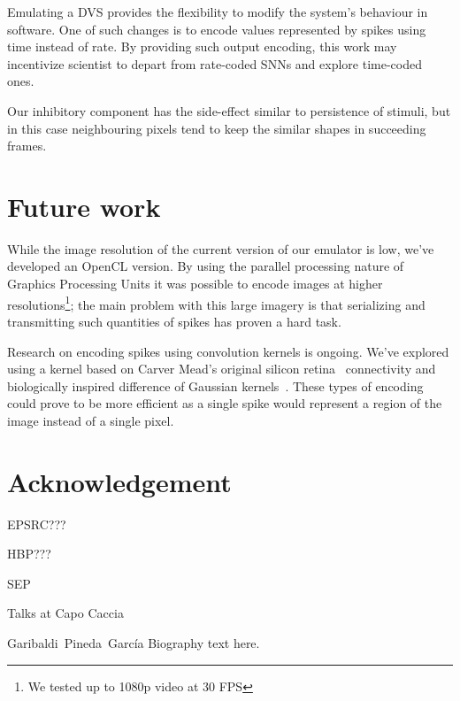 \documentclass[conference]{IEEEtran}
\begin{document}
Emulating a DVS provides the flexibility to modify the system's behaviour in software. One of such changes is to encode values represented by spikes using time instead of rate. By providing such output encoding, this work may incentivize  scientist to depart from rate-coded SNNs and explore time-coded ones.

Our inhibitory component has the side-effect similar to persistence of stimuli, but in this case neighbouring pixels tend to keep the similar shapes in succeeding frames. 

\section{Future work}
\label{sec:future-work}
While the image resolution of the current version of our emulator is low, we've developed an OpenCL version. By using the parallel processing nature of Graphics Processing Units it was possible to encode images at higher resolutions\footnote{We tested up to 1080p video at 30 FPS}; the main problem with this large imagery is that serializing and transmitting such quantities of spikes has proven a hard task.

Research on encoding spikes using convolution kernels is ongoing. We've explored using a kernel based on Carver Mead's original silicon retina~\cite{Mead1989} connectivity and biologically inspired difference of Gaussian kernels~\cite{basab}. These types of encoding could prove to be more efficient as a single spike would represent a region of the image instead of a single pixel.
\section*{Acknowledgement}
EPSRC??? 

HBP???

SEP 

Talks at Capo Caccia





\begin{IEEEbiography}{Garibaldi~Pineda~García}
  Biography text here.
\end{IEEEbiography}
\end{document}
